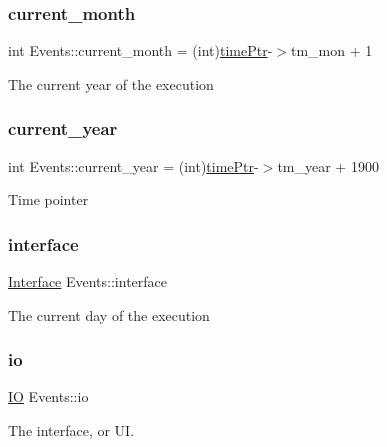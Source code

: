 \subsubsection{\texorpdfstring{current\+\_\+month}{current\_month}}
{\footnotesize\ttfamily int Events\+::current\+\_\+month = (int)\hyperlink{classEvents_ad5ad3f8eb6f5d0875ab7a74fb2bb06e5}{time\+Ptr}-\/$>$tm\+\_\+mon + 1\hspace{0.3cm}{\ttfamily [static]}}

The current year of the execution \mbox{\label{classEvents_a772f653c845f4eedf58ba446b7fee45a}} 
\subsubsection{\texorpdfstring{current\+\_\+year}{current\_year}}
{\footnotesize\ttfamily int Events\+::current\+\_\+year = (int)\hyperlink{classEvents_ad5ad3f8eb6f5d0875ab7a74fb2bb06e5}{time\+Ptr}-\/$>$tm\+\_\+year + 1900\hspace{0.3cm}{\ttfamily [static]}}

Time pointer \mbox{\label{classEvents_a397cb3524ec70d64e22144c12d53edda}} 
\subsubsection{\texorpdfstring{interface}{interface}}
{\footnotesize\ttfamily \hyperlink{classInterface}{Interface} Events\+::interface\hspace{0.3cm}{\ttfamily [static]}}

The current day of the execution \mbox{\label{classEvents_a7b8a2caf783b96de00de01145a8763d2}} 
\subsubsection{\texorpdfstring{io}{io}}
{\footnotesize\ttfamily \hyperlink{classIO}{IO} Events\+::io\hspace{0.3cm}{\ttfamily [static]}}

The interface, or UI. \mbox{\label{classEvents_ad5ad3f8eb6f5d0875ab7a74fb2bb06e5}} 
